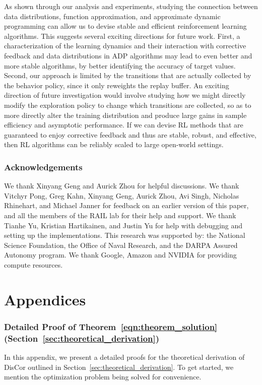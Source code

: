 \documentclass[jmlr]{article}
\begin{document}
As shown through our analysis and experiments, studying the connection between data distributions, function approximation, and approximate dynamic programming can allow us to devise stable and efficient reinforcement learning algorithms. This suggests several exciting directions for future work. First, a characterization of the learning dynamics and their interaction with corrective feedback and data distributions in ADP algorithms may lead to even better and more stable algorithms, by better identifying the accuracy of target values. Second, our approach is limited by the transitions that are actually collected by the behavior policy, since it only reweights the replay buffer.
An exciting direction of future investigation would involve studying how we might directly modify the exploration policy to change which transitions are collected, so as to more directly alter the training distribution and produce large gains in sample efficiency and asymptotic performance. 
If we can devise RL methods that are guaranteed to enjoy corrective feedback and thus are stable, robust, and effective, then RL algorithms can be reliably scaled to large open-world settings. 



 
 
\section*{Acknowledgements}
We thank Xinyang Geng and Aurick Zhou for helpful discussions. We thank Vitchyr Pong, Greg Kahn, Xinyang Geng, Aurick Zhou, Avi Singh, Nicholas Rhinehart, and Michael Janner for feedback on an earlier version of this paper, and all the members of the RAIL lab for their help and support. We thank Tianhe Yu, Kristian Hartikainen, and Justin Yu for help with debugging and setting up the implementations. This research was supported by: the National Science Foundation, the Office of Naval Research, and the DARPA Assured Autonomy program. We thank Google, Amazon and NVIDIA for providing compute resources.






\clearpage
\appendix
\part*{Appendices}

\section{Detailed Proof of Theorem~\ref{eqn:theorem_solution} (Section~\ref{sec:theoretical_derivation})}
\label{sec:missing_proof_steps}
In this appendix, we present a detailed proofs for the theoretical derivation of DisCor outlined in Section~\ref{sec:theoretical_derivation}. To get started, we mention the optimization problem being solved for convenience.
\end{document}
